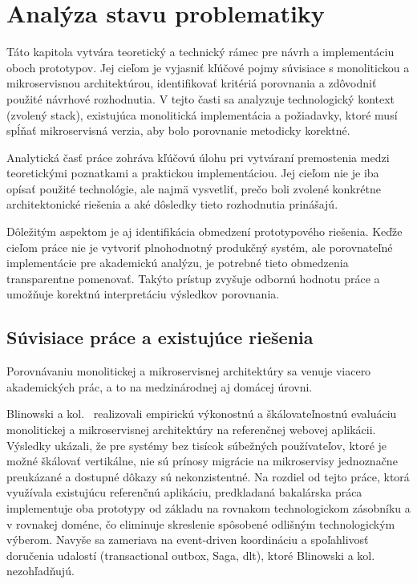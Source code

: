 \chapter{Analýza stavu problematiky}\label{ch:analytics}

Táto kapitola vytvára teoretický a technický rámec pre návrh a implementáciu oboch prototypov. Jej cieľom je vyjasniť kľúčové pojmy súvisiace s monolitickou a mikroservisnou architektúrou, identifikovať kritériá porovnania a zdôvodniť použité návrhové rozhodnutia. V tejto časti sa analyzuje technologický kontext (zvolený stack), existujúca monolitická implementácia a požiadavky, ktoré musí spĺňať mikroservisná verzia, aby bolo porovnanie metodicky korektné.

Analytická časť práce zohráva kľúčovú úlohu pri vytváraní premostenia medzi teoretickými poznatkami a praktickou implementáciou. Jej cieľom nie je iba opísať použité technológie, ale najmä vysvetliť, prečo boli zvolené konkrétne architektonické riešenia a aké dôsledky tieto rozhodnutia prinášajú.

Dôležitým aspektom je aj identifikácia obmedzení prototypového riešenia. Keďže cieľom práce nie je vytvoriť plnohodnotný produkčný systém, ale porovnateľné implementácie pre akademickú analýzu, je potrebné tieto obmedzenia transparentne pomenovať. Takýto prístup zvyšuje odbornú hodnotu práce a umožňuje korektnú interpretáciu výsledkov porovnania.

\section{Súvisiace práce a existujúce riešenia}

Porovnávaniu monolitickej a mikroservisnej architektúry sa venuje viacero akademických prác, a to na medzinárodnej aj domácej úrovni.

Blinowski a kol.~\cite{Blinowski2022} realizovali empirickú výkonostnú a škálovateľnostnú evaluáciu monolitickej a mikroservisnej architektúry na referenčnej webovej aplikácii. Výsledky ukázali, že pre systémy bez tisícok súbežných používateľov, ktoré je možné škálovať vertikálne, nie sú prínosy migrácie na mikroservisy jednoznačne preukázané a dostupné dôkazy sú nekonzistentné. Na rozdiel od tejto práce, ktorá využívala existujúcu referenčnú aplikáciu, predkladaná bakalárska práca implementuje oba prototypy od základu na rovnakom technologickom zásobníku a v rovnakej doméne, čo eliminuje skreslenie spôsobené odlišným technologickým výberom. Navyše sa zameriava na event-driven koordináciu a spoľahlivosť doručenia udalostí (transactional outbox, Saga, \acrshort{dlt}), ktoré Blinowski a kol. nezohľadňujú.


